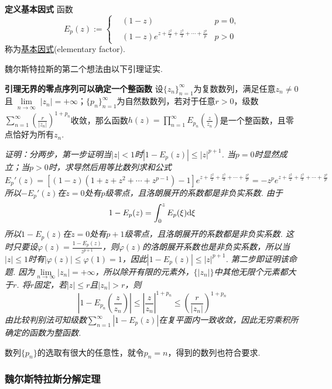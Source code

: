 \documentclass[UTF8]{ctexart}
\newcommand{\trm}[1]{{\rm #1}}
\newenvironment{definition}[1]
    {\begin{tcolorbox}[enhanced, colback=LightYellow, breakable=false, frame hidden, borderline west={1.5mm}{-2mm}{DarkGreen}]
    {\bfseries {\color{DarkGreen} 定义}\quad #1} \newline}
    {\end{tcolorbox}}
\newenvironment{lemma}[1]
    {\begin{tcolorbox}[enhanced, colback=LightYellow, breakable=true, frame hidden, borderline west={1.5mm}{-2mm}{DarkRed}]
    {\bfseries {\color{DarkRed} 引理}\quad #1} \newline}
    {\end{tcolorbox}}
\begin{document}
\begin{definition}{基本因式}
    函数
    \[E_p(z) := \left\{\begin{aligned} & (1-z) & p=0, \\ & (1-z)e^{z+\frac{z^2}{2}+\frac{z^3}{3}+\cdots+\frac{z^p}{p}} & p > 0 \end{aligned}\right.\]
    称为\uline{基本因式}(elementary factor).
\end{definition}

魏尔斯特拉斯的第二个想法由以下引理证实.
\begin{lemma}{无界的零点序列可以确定一个整函数}
    设\(\{z_n\}_{n=1}^{\infty}\)为复数数列，满足任意\(z_n \neq 0\)且\(\lim \limits_{\substack{n \to \infty}} |z_n|=+\infty\)；\(\{p_n\}_{n=1}^{\infty}\)为自然数数列，若对于任意\(r>0\)，级数\(\displaystyle{\sum_{n=1}^{\infty}\left(\frac{r}{|z_n|}\right)^{1+p_n}}\)收敛，那么函数\(\displaystyle{h(z)=\prod_{n=1}^{\infty}E_{p_n}\left(\frac{z}{z_n}\right)}\)是一个整函数，且零点恰好为所有\(z_n\).
\end{lemma}
\textit{
    证明：分两步，第一步证明当\(|z|<1\)时\(|1-E_p(z)| \leq |z|^{p+1}\). 当\(p=0\)时显然成立；当\(p > 0\)时，求导然后用等比数列求和公式
    \[E_p'(z) = [(1-z)(1+z+z^2+\cdots+z^{p-1})-1]e^{z+\frac{z^2}{2}+\frac{z^3}{3}+\cdots+\frac{z^p}{p}} = -z^pe^{z+\frac{z^2}{2}+\frac{z^3}{3}+\cdots+\frac{z^p}{p}}\]
    所以\(-E_p'(z)\)在\(z=0\)处有\(p\)级零点，且洛朗展开的系数都是非负实系数. 由于
    \[1-E_p(z)=\int_0^z E_p(\xi)\trm{d}\xi\]
    所以\(1-E_p(z)\)在\(z=0\)处有\(p+1\)级零点，且洛朗展开的系数都是非负实系数. 这时只要设\(\displaystyle{\varphi(z)=\frac{1-E_p(z)}{z^{p+1}}}\)，则\(\varphi(z)\)的洛朗展开系数也是非负实系数，所以当\(|z| \leq 1\)时有\(|\varphi(z)|\leq \varphi(1)=1\)，因此\(|1-E_p(z)| \leq |z|^{p+1}\).
    第二步即证明该命题. 因为\(\lim \limits_{n \to \infty} |z_n| = +\infty\)，所以除开有限的元素外，\(\{|z_n|\}\)中其他无限个元素都大于\(r\). 将\(r\)固定，若\(|z|\leq r\)且\(|z_n|>r\)，则
    \[\left|1-E_{p_n}\left(\frac{z}{z_n}\right)\right| \leq \left|\frac{z}{z_n}\right|^{1+p_n} \leq \left(\frac{r}{|z_n|}\right)^{1+p_n}\]
    由比较判别法可知级数\(\displaystyle{\sum_{n=1}^{\infty}|1-E_p(z)|}\)在复平面内一致收敛，因此无穷乘积所确定的函数为整函数.
}

数列\(\{p_n\}\)的选取有很大的任意性，就令\(p_n=n\)，得到的数列也符合要求.

\subsubsection{魏尔斯特拉斯分解定理}
\end{document}
